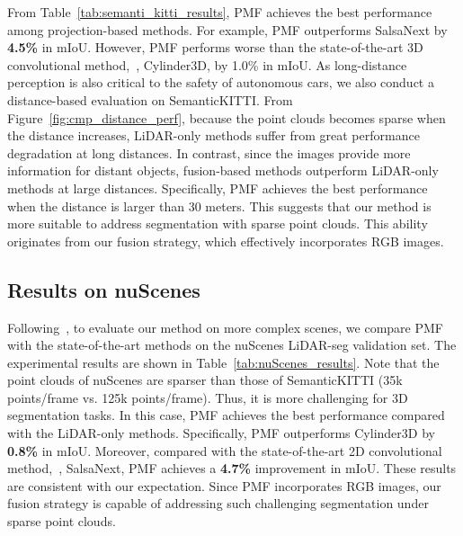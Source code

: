 \documentclass[10pt,twocolumn,letterpaper]{article}
\newcommand{\ice}[1]{{\color{black}#1}}
\newcommand{\hu}[1]{{\color{black}#1}}
\begin{document}
From Table~\ref{tab:semanti_kitti_results}, PMF achieves the best performance among projection-based methods. For example, PMF outperforms SalsaNext by \textbf{4.5\%} in mIoU. However, PMF performs worse than the state-of-the-art 3D convolutional method,~\ie, Cylinder3D, by 1.0\% in mIoU. 
As long-distance perception is also critical to the safety of autonomous cars, we also conduct a distance-based evaluation on SemanticKITTI. From Figure~\ref{fig:cmp_distance_perf}, because the point clouds becomes sparse when the distance increases, LiDAR-only methods suffer from great performance degradation at long distances. In contrast, 
since the images provide more information for distant objects, fusion-based methods outperform LiDAR-only methods at large distances. Specifically, PMF achieves the best performance when the distance is larger than 30 meters. \hu{This suggests that our method is more suitable to address segmentation with sparse point clouds. This ability originates from our fusion strategy, which effectively incorporates RGB images.}













\subsection{Results on nuScenes}
Following~\cite{zhu2021cylindrical}, to evaluate our method on more complex scenes, we compare PMF with the state-of-the-art methods on the nuScenes LiDAR-seg validation set. The experimental results are shown in Table~\ref{tab:nuScenes_results}. Note that the point clouds of nuScenes are sparser than those of SemanticKITTI (35k points/frame vs. 125k points/frame). Thus, it is more challenging for 3D segmentation tasks. In this case, PMF achieves the best performance compared with the LiDAR-only methods. Specifically, PMF outperforms Cylinder3D by \textbf{0.8\%} in mIoU. 
Moreover, compared with the state-of-the-art 2D convolutional method,~\ie, SalsaNext, PMF achieves a \textbf{4.7\%} improvement in mIoU. 
\ice{These results are consistent with our expectation. Since PMF incorporates RGB images, our fusion strategy is capable of addressing such challenging segmentation under sparse point clouds.}
\end{document}

